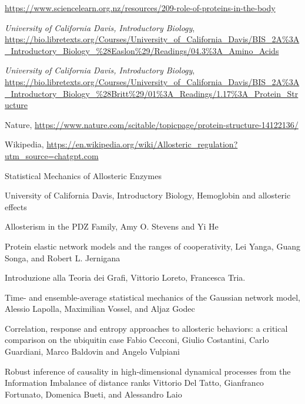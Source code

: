 \documentclass[English, Lau, oneside]{sapthesis}
\begin{document}
\newpage
\null
\thispagestyle{empty}
\newpage
\begin{thebibliography}{100}

    \url{https://www.sciencelearn.org.nz/resources/209-role-of-proteins-in-the-body}
    
    \emph{University of California Davis, Introductory Biology}, 
    \url{https://bio.libretexts.org/Courses/University_of_California_Davis/BIS_2A%3A_Introductory_Biology_%28Easlon%29/Readings/04.3%3A_Amino_Acids}
    
    \emph{University of California Davis, Introductory Biology}, 
    \url{https://bio.libretexts.org/Courses/University_of_California_Davis/BIS_2A%3A_Introductory_Biology_%28Britt%29/01%3A_Readings/1.17%3A_Protein_Structure}
    
    Nature, \url{https://www.nature.com/scitable/topicpage/protein-structure-14122136/}
    
    Wikipedia, \url{https://en.wikipedia.org/wiki/Allosteric_regulation?utm_source=chatgpt.com}
    
    Statistical Mechanics of Allosteric Enzymes
    
    University of California Davis, Introductory Biology, Hemoglobin and allosteric effects
    
    Allosterism in the PDZ Family, Amy O. Stevens and Yi He
    
    Protein elastic network models and the ranges of cooperativity, Lei Yanga, Guang Songa, and Robert L. Jernigana
    
    Introduzione alla Teoria dei Grafi, Vittorio Loreto, Francesca Tria.
    
    Time- and ensemble-average statistical mechanics of the Gaussian network model, Alessio Lapolla, Maximilian Vossel, and Aljaz Godec
    
    Correlation, response and entropy approaches to allosteric behaviors: a critical comparison on the ubiquitin case Fabio Cecconi, Giulio Costantini, Carlo Guardiani, Marco Baldovin and Angelo Vulpiani
    
    Robust inference of causality in high-dimensional dynamical processes from the Information Imbalance of distance ranks
    Vittorio Del Tatto, Gianfranco Fortunato, Domenica Bueti, and Alessandro Laio
\end{thebibliography}
\end{document}
